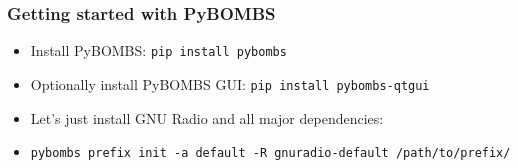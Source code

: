 \documentclass{beamer}
\begin{document}
\begin{frame}
  \frametitle{Getting started with PyBOMBS}
  \begin{itemize}
    \item Install PyBOMBS\@: \texttt{pip install pybombs}
    \item Optionally install PyBOMBS GUI\@: \texttt{pip install pybombs-qtgui}
    \item Let's just install GNU Radio and all major dependencies:
    \item \footnotesize{\texttt{pybombs prefix init -a default -R gnuradio-default /path/to/prefix/}}
  \end{itemize}
\end{frame}

\end{document}
